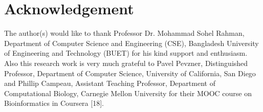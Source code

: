 \documentclass[preprint,12pt]{elsarticle}
\begin{document}
\section*{Acknowledgement}
The author(s) would like to thank Professor Dr. Mohammad Sohel Rahman, Department of Computer Science and Engineering (CSE), Bangladesh University of Engineering and Technology (BUET) for his kind support and enthusiasm. Also this research work is very much grateful to Pavel Pevzner, Distinguished Professor, Department of Computer Science, University of California, San Diego and Phillip Campeau, Assistant Teaching Professor, Department of Computational Biology, Carnegie Mellon University for their MOOC course on Bioinformatics in Coursera [18]. 






\end{document}
